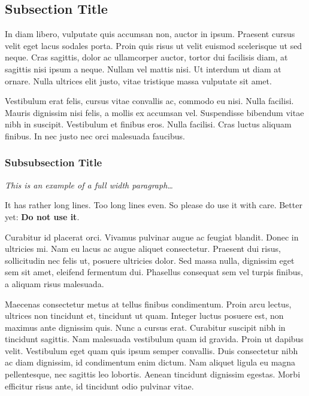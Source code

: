 \documentclass[
	a4paper, %
	11pt, %
]{DC_Report}
\begin{document}
\subsection{Subsection Title} %

In diam libero, vulputate quis accumsan non, auctor in ipsum. Praesent cursus velit eget lacus sodales porta. Proin quis risus ut velit euismod scelerisque ut sed neque. Cras sagittis, dolor ac ullamcorper auctor, tortor dui facilisis diam, at sagittis nisi ipsum a neque. Nullam vel mattis nisi. Ut interdum ut diam at ornare. Nulla ultrices elit justo, vitae tristique massa vulputate sit amet.

Vestibulum erat felis, cursus vitae convallis ac, commodo eu nisi. Nulla facilisi. Mauris dignissim nisi felis, a mollis ex accumsan vel. Suspendisse bibendum vitae nibh in suscipit. Vestibulum et finibus eros. Nulla facilisi. Cras luctus aliquam finibus. In nec justo nec orci malesuada faucibus.

\subsubsection{Subsubsection Title} %

\begin{fullwidth} %
	\textit{This is an example of a full width paragraph\ldots} 
 
It has  rather long lines. Too long lines even. So please do use it with care. Better yet: \textbf{Do not use it}.

 Curabitur id placerat orci. Vivamus pulvinar augue ac feugiat blandit. Donec in ultricies mi. Nam eu lacus ac augue aliquet consectetur. Praesent dui risus, sollicitudin nec felis ut, posuere ultricies dolor. Sed massa nulla, dignissim eget sem sit amet, eleifend fermentum dui. Phasellus consequat sem vel turpis finibus, a aliquam risus malesuada.
\end{fullwidth}

Maecenas consectetur metus at tellus finibus condimentum. Proin arcu lectus, ultrices non tincidunt et, tincidunt ut quam. Integer luctus posuere est, non maximus ante dignissim quis. Nunc a cursus erat. Curabitur suscipit nibh in tincidunt sagittis. Nam malesuada vestibulum quam id gravida. Proin ut dapibus velit. Vestibulum eget quam quis ipsum semper convallis. Duis consectetur nibh ac diam dignissim, id condimentum enim dictum. Nam aliquet ligula eu magna pellentesque, nec sagittis leo lobortis. Aenean tincidunt dignissim egestas. Morbi efficitur risus ante, id tincidunt odio pulvinar vitae.
\end{document}
